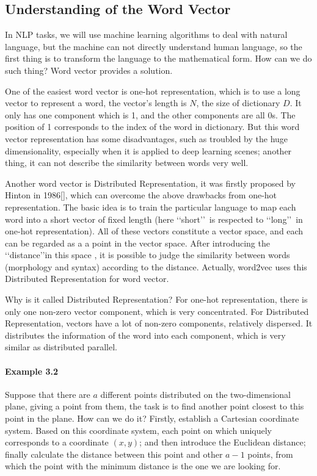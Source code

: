 \subsection{Understanding of the Word Vector}
In NLP tasks, we will use machine learning algorithms to deal with natural language, but the machine can not directly understand human language, so the first thing is to transform the language to the mathematical form. How can we do such thing? Word vector provides a solution.

One of the easiest word vector is one-hot representation, which is to use a long vector to represent a word, the vector's length is  $N$, the size of dictionary $D$. It only has one component which is 1, and the other components are all 0s. The position of 1 corresponds to the index of the word in dictionary. But this word vector representation has some disadvantages, such as troubled by the huge dimensionality, especially when it is applied to deep learning scenes; another thing, it can not describe the similarity between words very well.

Another word vector is Distributed Representation, it was firstly proposed by Hinton in 1986[], which can overcome the above drawbacks from one-hot representation. The basic idea is to train the particular language to map each word into a short vector of fixed length (here \lq\lq short\rq\rq\ is respected to \lq\lq long\rq\rq\ in one-hot representation). All of these vectors constitute a vector space, and each can be regarded as a a point in the vector space. After introducing the \lq\lq distance\rq\rq in this space , it is possible to judge the similarity between words (morphology and syntax) according to the distance. Actually, word2vec uses this Distributed Representation for word vector.

Why is it called Distributed Representation? For one-hot representation, there is only one non-zero vector component, which is very concentrated. For Distributed Representation, vectors have a lot of non-zero components, relatively dispersed. It distributes the information of the word into each component, which is very similar as distributed parallel.
\paragraph{Example 3.2} Suppose that there are $a$ different points distributed on the two-dimensional plane, giving a point from them, the task is to find another point closest to this point in the plane. How can we do it? Firstly, establish a Cartesian coordinate system. Based on this coordinate system, each point on which uniquely corresponds to a coordinate $(x, y)$; and then introduce the Euclidean distance; finally calculate the distance between this point and other $a-1$ points, from which the point with the minimum distance is the one we are looking for.

